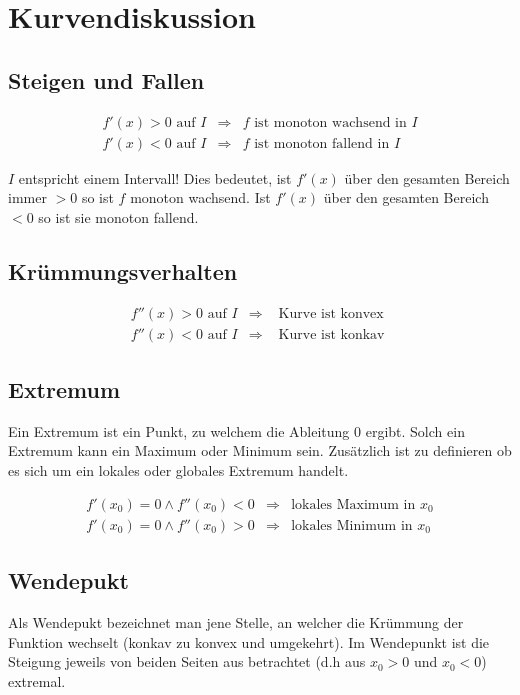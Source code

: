 \section{Kurvendiskussion}

\subsection{Steigen und Fallen}

\[ \boxed{ \begin{matrix}
f'(x) > 0 \text{ auf } I & \Rightarrow  & f \text{ ist monoton wachsend in $I$} \\
f'(x) < 0 \text{ auf } I & \Rightarrow  & f \text{ ist monoton fallend in $I$}
\end{matrix} } \]

\noindent
$I$ entspricht einem Intervall! Dies bedeutet, ist $f'(x)$ über den gesamten Bereich immer $>0$ so ist $f$ monoton wachsend.
Ist $f'(x)$ über den gesamten Bereich $<0$ so ist sie monoton fallend.

\subsection{Krümmungsverhalten}

\[ \boxed{ \begin{matrix}
f''(x) > 0 \text{ auf } I & \Rightarrow  & \text{ Kurve ist konvex } \\
f''(x) < 0 \text{ auf } I & \Rightarrow  & \text{ Kurve ist konkav }
\end{matrix} } \]

\subsection{Extremum}
Ein Extremum ist ein Punkt, zu welchem die Ableitung $0$ ergibt.
Solch ein Extremum kann ein Maximum oder Minimum sein.
Zusätzlich ist zu definieren ob es sich um ein lokales oder globales Extremum handelt.

\[ \boxed{ \begin{matrix}
f'(x_0) = 0 \land f''(x_0) < 0 & \Rightarrow & \text{lokales Maximum in $x_0$} \\
f'(x_0) = 0 \land f''(x_0) > 0 & \Rightarrow & \text{lokales Minimum in $x_0$} 
\end{matrix} } \]

\subsection{Wendepukt}
Als Wendepukt bezeichnet man jene Stelle, an welcher die Krümmung der Funktion wechselt (konkav zu konvex und umgekehrt).
Im Wendepunkt ist die Steigung jeweils von beiden Seiten aus betrachtet (d.h aus $x_0 > 0$ und $x_0<0$) extremal.

